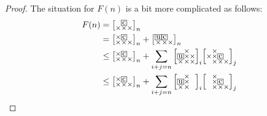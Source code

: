 \documentclass[a4paper,12pt]{article}
\makeatletter
\newcommand{\mybox}[1]{%
  \begingroup
  \setlength{\fboxsep}{1pt}%
  \fbox{\small #1}%
  \endgroup
}
\newenvironment{grid}
  {\begingroup\footnotesize
   \renewcommand{\arraystretch}{0}
   \setlength{\arraycolsep}{0pt}
   \left[\begin{array}{@{}*{10}{c}@{}}}
  {\end{array}\right]\endgroup}
\newcommand{\void}{\phantom{\times}}
\makeatother
\begin{document}
\begin{proof}
The situation for $F(n)$ is a bit more complicated as follows:
\begin{align*}
    F(n) &=     \begin{grid}
        \void & \mybox{c} & \void \\
        \times & \times & \times
    \end{grid}_n \\
    &= \begin{grid}
        \times & \mybox{c} & \void \\
        \times & \times & \times
    \end{grid}_n + \begin{grid}
        \mybox{u} & \mybox{c} & \void \\
        \times & \times & \times
    \end{grid}_n \\
    &\le \begin{grid}
        \times & \mybox{c} & \void \\
        \times & \times & \times
    \end{grid}_n + \sum_{i+j=n} \begin{grid}
        \void & \times &\void \\
        \mybox{u} & \times & \times \\
        \times & \times &\times
    \end{grid}_i \begin{grid}
        \void & \times & \void & \void \\
        \times & \times & \mybox{c} & \void \\
        \void & \times & \times & \times
    \end{grid}_j \\
    &\le \begin{grid}
        \times & \mybox{c} & \void \\
        \times & \times & \times
    \end{grid}_n + \sum_{i+j=n} \begin{grid}
        \void & \times & \void \\
        \mybox{u} & \times & \void \\
        \times & \times &\void
    \end{grid}_i \begin{grid}
        \void & \times & \void & \void \\
        \void & \times & \mybox{c} & \void \\
        \void & \times & \times & \times
    \end{grid}_j \\

\end{align*}
\end{proof}
\end{document}
